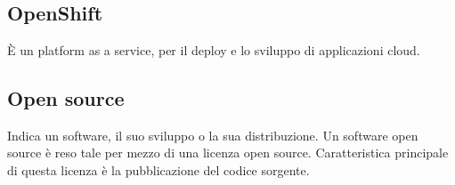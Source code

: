 \section{}
\subsection*{OpenShift} È un platform as a service, per il deploy e lo sviluppo di applicazioni cloud. 

\subsection*{Open source} Indica un software, il suo sviluppo o la sua distribuzione. Un software open source è reso tale per mezzo di una licenza open source. Caratteristica principale di questa licenza è la pubblicazione del codice sorgente.